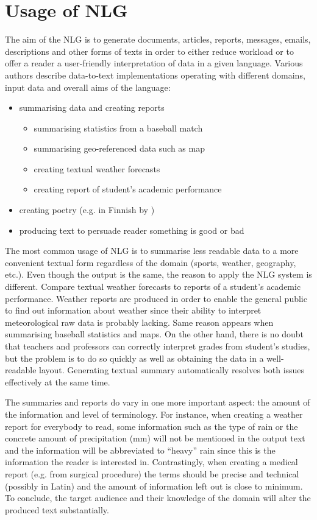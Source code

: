 \section{Usage of NLG}
The aim of the NLG is to generate documents, articles, reports, messages, emails, descriptions and other forms of texts in order to either reduce workload or to offer a reader a user-friendly interpretation of data in a given language. Various authors describe data-to-text implementations operating with different domains, input data and overall aims of the language:
\begin{itemize}
	\item summarising data and creating reports 
	\begin{itemize}
		\item summarising statistics from a baseball match \cite{puduppully2022data}
		\item summarising geo-referenced data such as map \cite{thomas2007atlas}
		\item creating textual weather forecasts \cite{sripada2014case}
		\item creating report of student's academic performance \cite{}
	\end{itemize}
	\item creating poetry (e.g. in Finnish by \cite{hamalainen2018harnessing})
	\item producing text to persuade reader something is good or bad \cite{carenini2006generating}
\end{itemize}

The most common usage of NLG is to summarise less readable data to a more convenient textual form regardless of the domain (sports, weather, geography, etc.). Even though the output is the same, the reason to apply the NLG system is different. Compare textual weather forecasts to reports of a student's academic performance. Weather reports are produced in order to enable the general public to find out information about weather since their ability to interpret meteorological raw data is probably lacking. Same reason appears when summarising baseball statistics and maps. On the other hand, there is no doubt that teachers and professors can correctly interpret grades from student’s studies, but the problem is to do so quickly as well as obtaining the data in a well-readable layout. Generating textual summary automatically resolves both issues effectively at the same time.

The summaries and reports do vary in one more important aspect: the amount of the information and level of terminology. For instance, when creating a weather report for everybody to read,  some information such as the type of rain or the concrete amount of  precipitation (mm) will not be mentioned in the output text and the information will be abbreviated to “heavy” rain since this is the information the reader is interested in. Contrastingly, when creating a medical report (e.g. from surgical procedure) the terms should be precise and technical (possibly in Latin) and the amount of information left out is close to minimum. To conclude, the target audience and their knowledge of the domain will alter the produced text substantially.

